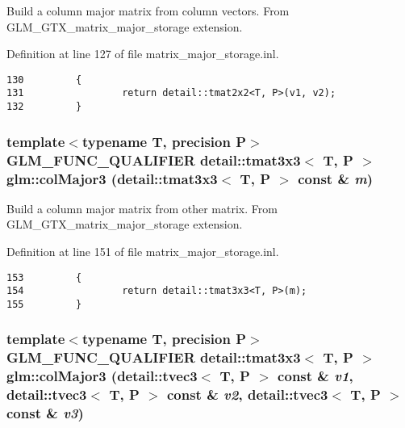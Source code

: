 Build a column major matrix from column vectors. From GLM\_\-GTX\_\-matrix\_\-major\_\-storage extension. 

Definition at line 127 of file matrix\_\-major\_\-storage.inl.

\begin{Code}\begin{verbatim}130         {
131                 return detail::tmat2x2<T, P>(v1, v2);
132         }
\end{verbatim}
\end{Code}


\hypertarget{group__gtx__matrix__major__storage_g645e8b3708b02ae2ca1c4f3048f8f32a}{
\subsubsection[colMajor3]{\setlength{\rightskip}{0pt plus 5cm}template$<$typename T, precision P$>$ GLM\_\-FUNC\_\-QUALIFIER detail::tmat3x3$<$ T, P $>$ glm::colMajor3 (detail::tmat3x3$<$ T, P $>$ const \& {\em m})}}
\label{group__gtx__matrix__major__storage_g645e8b3708b02ae2ca1c4f3048f8f32a}


Build a column major matrix from other matrix. From GLM\_\-GTX\_\-matrix\_\-major\_\-storage extension. 

Definition at line 151 of file matrix\_\-major\_\-storage.inl.

\begin{Code}\begin{verbatim}153         {
154                 return detail::tmat3x3<T, P>(m);
155         }
\end{verbatim}
\end{Code}


\hypertarget{group__gtx__matrix__major__storage_gfa499e4dd0fe76587feea1f3ad8dcfef}{
\subsubsection[colMajor3]{\setlength{\rightskip}{0pt plus 5cm}template$<$typename T, precision P$>$ GLM\_\-FUNC\_\-QUALIFIER detail::tmat3x3$<$ T, P $>$ glm::colMajor3 (detail::tvec3$<$ T, P $>$ const \& {\em v1}, \/  detail::tvec3$<$ T, P $>$ const \& {\em v2}, \/  detail::tvec3$<$ T, P $>$ const \& {\em v3})}}
\label{group__gtx__matrix__major__storage_gfa499e4dd0fe76587feea1f3ad8dcfef}


